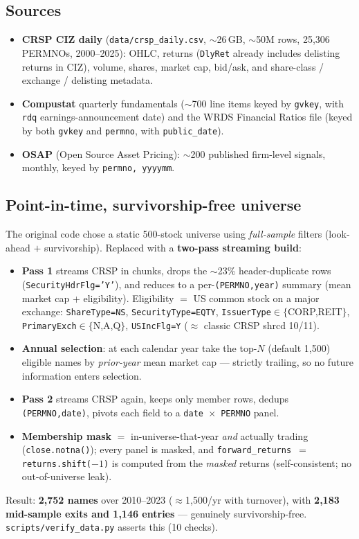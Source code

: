 \documentclass[11pt]{article}
\newcommand{\code}[1]{\texttt{#1}}
\newcommand{\file}[1]{\texttt{#1}}
\begin{document}
\subsection{Sources}
\begin{itemize}[leftmargin=*]
  \item \textbf{CRSP CIZ daily} (\file{data/crsp\_daily.csv}, $\sim$26\,GB, $\sim$50M
  rows, 25{,}306 PERMNOs, 2000--2025): OHLC, returns (\code{DlyRet} already includes
  delisting returns in CIZ), volume, shares, market cap, bid/ask, and
  share-class / exchange / delisting metadata.
  \item \textbf{Compustat} quarterly fundamentals ($\sim$700 line items keyed by
  \code{gvkey}, with \code{rdq} earnings-announcement date) and the WRDS Financial
  Ratios file (keyed by both \code{gvkey} and \code{permno}, with \code{public\_date}).
  \item \textbf{OSAP} (Open Source Asset Pricing): $\sim$200 published firm-level
  signals, monthly, keyed by \code{permno, yyyymm}.
\end{itemize}

\subsection{Point-in-time, survivorship-free universe}
The original code chose a static 500-stock universe using \emph{full-sample} filters
(look-ahead $+$ survivorship). Replaced with a \textbf{two-pass streaming build}:
\begin{itemize}[leftmargin=*]
  \item \textbf{Pass 1} streams CRSP in chunks, drops the $\sim$23\% header-duplicate
  rows (\code{SecurityHdrFlg='Y'}), and reduces to a per-\code{(PERMNO,year)} summary
  (mean market cap + eligibility). Eligibility $=$ US common stock on a major
  exchange: \code{ShareType=NS}, \code{SecurityType=EQTY},
  \code{IssuerType}$\in\{$CORP,REIT$\}$, \code{PrimaryExch}$\in\{$N,A,Q$\}$,
  \code{USIncFlg=Y} ($\approx$ classic CRSP shrcd 10/11).
  \item \textbf{Annual selection}: at each calendar year take the top-$N$
  (default 1{,}500) eligible names by \emph{prior-year} mean market cap --- strictly
  trailing, so no future information enters selection.
  \item \textbf{Pass 2} streams CRSP again, keeps only member rows, dedups
  \code{(PERMNO,date)}, pivots each field to a \code{date $\times$ PERMNO} panel.
  \item \textbf{Membership mask} $=$ in-universe-that-year \emph{and} actually trading
  (\code{close.notna()}); every panel is masked, and
  \code{forward\_returns $=$ returns.shift($-1$)} is computed from the \emph{masked}
  returns (self-consistent; no out-of-universe leak).
\end{itemize}
Result: \textbf{2{,}752 names} over 2010--2023 ($\approx$1{,}500/yr with turnover),
with \textbf{2{,}183 mid-sample exits and 1{,}146 entries} --- genuinely
survivorship-free. \file{scripts/verify\_data.py} asserts this (10 checks).
\end{document}
